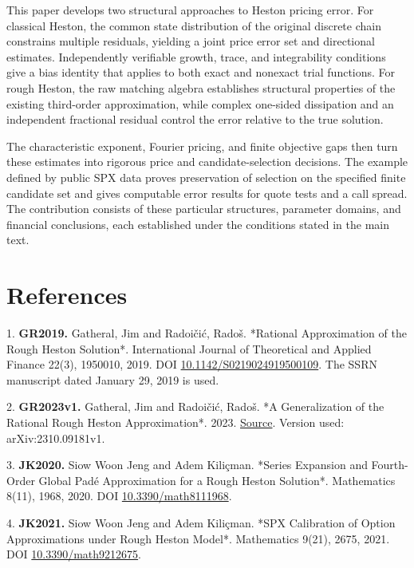 \documentclass[a4paper,11pt]{article}
\begin{document}
This paper develops two structural approaches to Heston pricing error. For classical Heston, the common state distribution of the original discrete chain constrains multiple residuals, yielding a joint price error set and directional estimates. Independently verifiable growth, trace, and integrability conditions give a bias identity that applies to both exact and nonexact trial functions. For rough Heston, the raw matching algebra establishes structural properties of the existing third-order approximation, while complex one-sided dissipation and an independent fractional residual control the error relative to the true solution.

The characteristic exponent, Fourier pricing, and finite objective gaps then turn these estimates into rigorous price and candidate-selection decisions. The example defined by public SPX data proves preservation of selection on the specified finite candidate set and gives computable error results for quote tests and a call spread. The contribution consists of these particular structures, parameter domains, and financial conclusions, each established under the conditions stated in the main text.

\section*{References}

1. \textbf{GR2019.} Gatheral, Jim and Radoičić, Radoš. *Rational Approximation of the Rough Heston Solution*. International Journal of Theoretical and Applied Finance 22(3), 1950010, 2019. DOI \href{https://doi.org/10.1142/S0219024919500109}{10.1142/S0219024919500109}. The SSRN manuscript dated January 29, 2019 is used.

2. \textbf{GR2023v1.} Gatheral, Jim and Radoičić, Radoš. *A Generalization of the Rational Rough Heston Approximation*. 2023. \href{https://arxiv.org/abs/2310.09181v1}{Source}. Version used: arXiv:2310.09181v1.

3. \textbf{JK2020.} Siow Woon Jeng and Adem Kiliçman. *Series Expansion and Fourth-Order Global Padé Approximation for a Rough Heston Solution*. Mathematics 8(11), 1968, 2020. DOI \href{https://doi.org/10.3390/math8111968}{10.3390/math8111968}.

4. \textbf{JK2021.} Siow Woon Jeng and Adem Kiliçman. *SPX Calibration of Option Approximations under Rough Heston Model*. Mathematics 9(21), 2675, 2021. DOI \href{https://doi.org/10.3390/math9212675}{10.3390/math9212675}.
\end{document}
